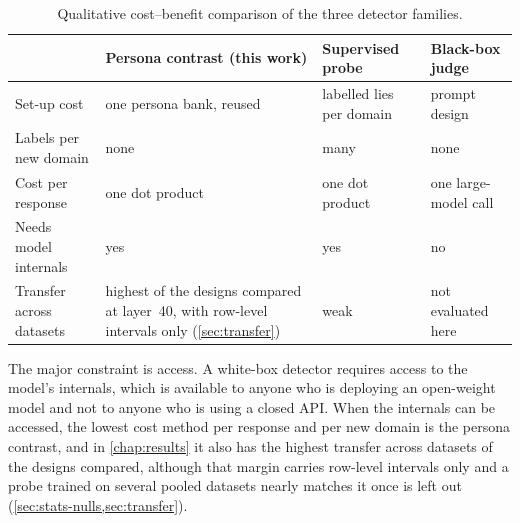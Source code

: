 \begin{table}[t]
\centering
\small
\caption{Qualitative cost--benefit comparison of the three detector families.}
\label{tab:costbenefit}
\begin{tabularx}{\linewidth}{@{}>{\raggedright\arraybackslash}p{3.3cm} >{\raggedright\arraybackslash}X >{\raggedright\arraybackslash}X >{\raggedright\arraybackslash}X@{}}
\toprule
 & Persona contrast (this work) & Supervised probe & Black-box judge \\
\midrule
Set-up cost & one persona bank, reused & labelled lies per domain & prompt design \\
Labels per new domain & none & many & none \\
Cost per response & one dot product & one dot product & one large-model call \\
Needs model internals & yes & yes & no \\
Transfer across datasets & highest of the designs compared at layer~40, with row-level intervals
only (\cref{sec:transfer}) & weak & not evaluated here \\
\bottomrule
\end{tabularx}
\end{table}

The major constraint is access. A white-box detector requires access to the model's internals,
which is available to anyone who is deploying an open-weight model and not to anyone who is
using a closed API. When the internals can be accessed, the lowest cost method per response
and per new domain is the persona contrast, and in \cref{chap:results} it also has the highest transfer across datasets
of the designs compared, although that margin carries row-level intervals only and a probe trained
on several pooled datasets nearly matches it once \hpkr{} is left out
(\cref{sec:stats-nulls,sec:transfer}).
